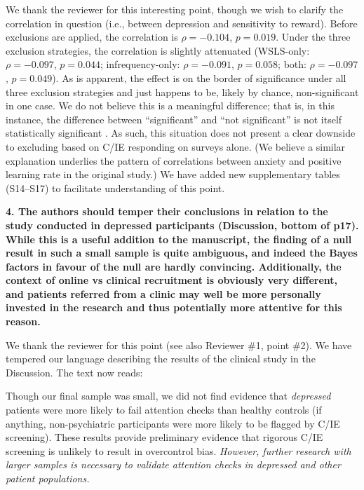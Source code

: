 \documentclass[a4paper,notitlepage,12pt]{article}
\begin{document}
We thank the reviewer for this interesting point, though we wish to clarify the correlation in question (i.e., between depression and sensitivity to reward). Before exclusions are applied, the correlation is $\rho = -0.104$, $p = 0.019$. Under the three exclusion strategies, the correlation is slightly attenuated (WSLS-only: $\rho = -0.097$, $p = 0.044$; infrequency-only: $\rho = -0.091$, $p = 0.058$; both: $\rho = -0.097$, $p = 0.049$). As is apparent, the effect is on the border of significance under all three exclusion strategies and just happens to be, likely by chance, non-significant in one case. We do not believe this is a meaningful difference; that is, in this instance, the difference between ``significant'' and ``not significant'' is not itself statistically significant \cite{gelman2006difference}. As such, this situation does not present a clear downside to excluding based on C/IE responding on surveys alone. (We believe a similar explanation underlies the pattern of correlations between anxiety and positive learning rate in the original study.) We have added new supplementary tables (S14--S17) to facilitate understanding of this point. 

\textbf{4. The authors should temper their conclusions in relation to the study conducted in depressed participants (Discussion, bottom of p17). While this is a useful addition to the manuscript, the finding of a null result in such a small sample is quite ambiguous, and indeed the Bayes factors in favour of the null are hardly convincing. Additionally, the context of online vs clinical recruitment is obviously very different, and patients referred from a clinic may well be more personally invested in the research and thus potentially more attentive for this reason.}

We thank the reviewer for this point (see also Reviewer \#1, point \#2). We have tempered our language describing the results of the clinical study in the Discussion. The text now reads:

\begin{displayquote}
    Though our final sample was small, we did not find evidence that \textit{depressed} patients were more likely to fail attention checks than healthy controls (if anything, non-psychiatric participants were more likely to be flagged by C/IE screening). These results provide preliminary evidence that rigorous C/IE screening is unlikely to result in overcontrol bias. \textit{However, further research with larger samples is necessary to validate attention checks in depressed and other patient populations.} 
\end{displayquote}
\end{document}
